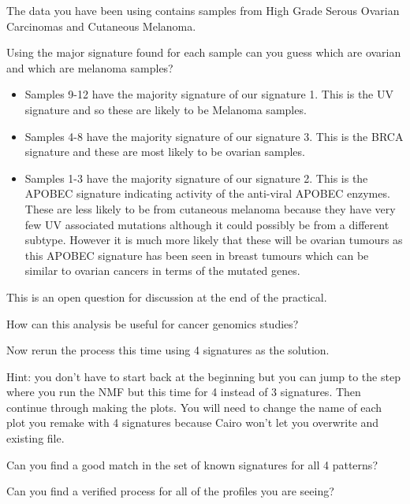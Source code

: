 \begin{information}
The data you have been using contains samples from High Grade Serous Ovarian Carcinomas and Cutaneous Melanoma. 
\end{information}

\begin{questions}
Using the major signature found for each sample can you guess which are ovarian and which are melanoma samples?
\end{questions}

\begin{answer}
\begin{itemize}
\item Samples 9-12 have the majority signature of our signature 1. This is the UV signature and so these are likely to be Melanoma samples.
\item Samples 4-8 have the majority signature of our signature 3. This is the BRCA signature and these are most likely to be ovarian samples.
\item Samples 1-3 have the majority signature of our signature 2. This is the APOBEC signature indicating activity of the anti-viral APOBEC enzymes. These are less likely to be from cutaneous melanoma because they have very few UV associated mutations although it could possibly be from a different subtype. However it is much more likely that these will be ovarian tumours as this APOBEC signature has been seen in breast tumours which can be similar to ovarian cancers in terms of the mutated genes.
\end{itemize}
\end{answer}

\begin{questions}
This is an open question for discussion at the end of the practical.

How can this analysis be useful for cancer genomics studies?
\end{questions}

\begin{advanced}
Now rerun the process this time using 4 signatures as the solution.
\vspace{4 mm}
\begin{information}
Hint: you don't have to start back at the beginning but you can jump
to the step where you run the NMF but this time for 4 instead of 3
signatures. Then continue through making the plots.
\vspace{4 mm}
You will need to change the name of each plot you remake with 4
signatures because Cairo won't let you overwrite and existing file.
\end{information}
\begin{questions}
Can you find a good match in the set of known signatures for all 4 patterns? 

Can you find a verified process for all of the profiles you are seeing? 
\end{questions}
\end{advanced}

